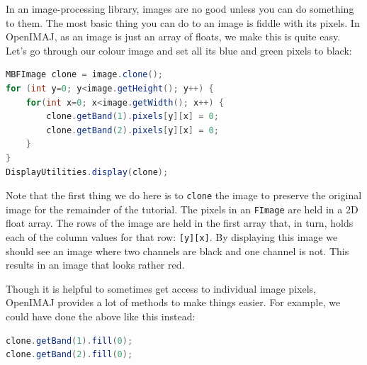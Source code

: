 In an image-processing library, images are no good unless you can do something to them. The most basic 
thing you can do to an image is fiddle with its pixels. In OpenIMAJ, as an image is just an array of 
floats, we make this is quite easy. Let's go through our colour image and set all its blue and green 
pixels to black: 
\begin{lstlisting}[language=java]
MBFImage clone = image.clone();
for (int y=0; y<image.getHeight(); y++) {
    for(int x=0; x<image.getWidth(); x++) {
        clone.getBand(1).pixels[y][x] = 0;
        clone.getBand(2).pixels[y][x] = 0;
    }
}
DisplayUtilities.display(clone);
\end{lstlisting}
Note that the first thing we do here is to \verb+clone+ the image to preserve the original image
for the remainder of the tutorial. The pixels in an \verb+FImage+ are held in a 2D float array. The rows 
of the image are held in the first array that, in turn, holds each of the column values for that 
row:  \verb+[y][x]+. By displaying this image we should see an image where two channels are black 
and one channel is not. This results in an image that looks rather red. 

Though it is helpful to sometimes get access to individual image pixels, OpenIMAJ provides a lot 
of methods to make things easier. For example, we could have done the above like this instead:
\begin{lstlisting}[language=java]
clone.getBand(1).fill(0);
clone.getBand(2).fill(0);
\end{lstlisting}

